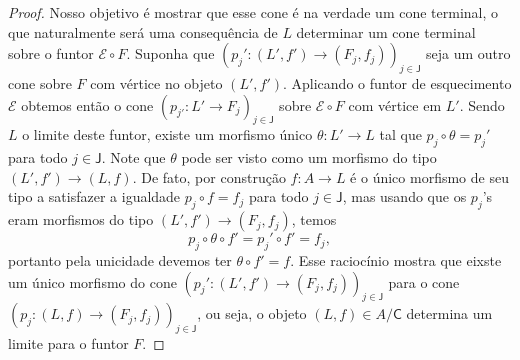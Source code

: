 \begin{proof}
  Nosso objetivo é mostrar que esse cone é na verdade um cone terminal, o que naturalmente será uma consequência de $L$ determinar um cone terminal sobre o funtor $\mathcal{E} \circ F$.
  Suponha que $(p_{j}': (L',f') \to (F_{j},f_{j}))_{j \in \mathsf{J}}$ seja um outro cone sobre $F$ com vértice no objeto $(L',f')$.
  Aplicando o funtor de esquecimento $\mathcal{E}$ obtemos então o cone $(p_{j'}: L' \to F_{j})_{j \in \mathsf{J}}$ sobre $\mathcal{E} \circ F$ com vértice em $L'$.
  Sendo $L$ o limite deste funtor, existe um morfismo único $\theta: L' \to L$ tal que $p_{j} \circ \theta = p_{j}'$ para todo $j \in \mathsf{J}$.
  Note que $\theta$ pode ser visto como um morfismo do tipo $(L',f') \to (L,f)$.
  De fato, por construção $f: A \to L$ é o único morfismo de seu tipo a satisfazer a igualdade $p_{j} \circ f = f_{j}$ para todo $j \in \mathsf{J}$, mas usando que os $p_{j}$'s eram morfismos do tipo $(L',f') \to (F_{j},f_{j})$, temos
  \begin{displaymath}
    p_{j} \circ \theta \circ f' = p_{j}' \circ f' = f_{j},
  \end{displaymath}
  portanto pela unicidade devemos ter $\theta \circ f' = f$.
  Esse raciocínio mostra que eixste um único morfismo do cone $(p_{j}': (L',f') \to (F_{j},f_{j}))_{j \in \mathsf{J}}$ para o cone $(p_{j}: (L,f) \to (F_{j},f_{j}))_{j \in \mathsf{J}}$, ou seja, o objeto $(L,f) \in A / \mathsf{C}$ determina um limite para o funtor $F$.
\end{proof}



